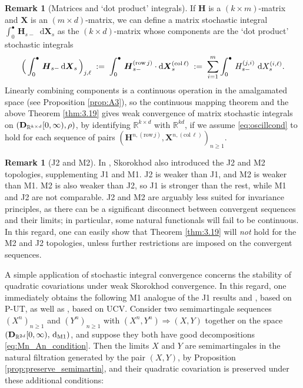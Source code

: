\documentclass[11pt]{article}
\theoremstyle{definition}\newtheorem{example}[theorem]{Example}
\theoremstyle{definition}\newtheorem{counterexample}[theorem]{Counterexample}
\theoremstyle{definition}\newtheorem{remark}[theorem]{Remark}
\theoremstyle{definition}\newtheorem{defi}[theorem]{Definition}
\numberwithin{equation}{section}
\newcommand{\R}{\mathbb{R}}
\newcommand{\D}{{\bf D}}											%
\newcommand*\diff{\mathop{}\!\mathrm{d}}								%
\renewcommand{\|}{\; : \, \;}											%
\newcommand{\dM}{\diff_{\operatorname{M1}}}							%
\begin{document}
\begin{remark}[Matrices and `dot product' integrals]
	If $\boldsymbol{H}$ is a $(k \times m)$-matrix and $\boldsymbol{X}$ is an $(m \times d)$-matrix, we can define a matrix stochastic integral $\int_0^\bullet \, \!\boldsymbol{H}_{s-} \diff \boldsymbol{X}_s$ as the $(k \times d)$-matrix whose components are the `dot product' stochastic integrals \[
	\Bigl( \, \int_0^\bullet \, \boldsymbol{H}_{s-} \diff \boldsymbol{X}_s\, \Bigr)_{j,\ell} \; := \; \int_0^\bullet \,\boldsymbol{H}^{(\text{row}\,j)}_{s-} \cdot \diff \boldsymbol{X}^{(\text{col}\,\ell)}_s \; :=  \; \sum_{i=1}^m 	\int_0^\bullet \, H^{(j,i)}_{s-}\, \diff X^{(i,\ell)}_s.
	\]
	Linearly combining components is a continuous operation in the  amalgamated space (see Proposition \ref{prop:A3}), so the continuous mapping theorem and the above Theorem \ref{thm:3.19} gives weak convergence of matrix stochastic integrals on $(\D_{\R^{k\times d}}[0,\infty), \rho)$, by identifying $\R^{k \times d}$ with $\R^{kd}$, if we assume \eqref{eq:oscillcond} to hold for each sequence of pairs $(\boldsymbol{H}^{n,(\text{row}\,j)},\boldsymbol{X}^{n,(\text{col}\,\ell)})_{n\ge 1}$.
\end{remark}



\begin{remark}[J2 and M2] In \cite{skorokhod}, Skorokhod also introduced the J2 and M2 topologies, supplementing J1 and M1. J2 is weaker than J1, and M2 is weaker than M1. M2 is also weaker than J2, so J1 is stronger than the rest, while M1 and J2 are not comparable. J2 and M2 are arguably less suited for invariance principles, as there can be a significant disconnect between convergent sequences and their limits; in particular, some natural functionals will fail to be continuous. In this regard, one can easily show that Theorem \ref{thm:3.19} will \emph{not} hold for the M2 and J2 topologies, unless further restrictions are imposed on the convergent sequences.
\end{remark}

A simple application of stochastic integral convergence concerns the stability of quadratic covariations under weak Skorokhod convergence. In this regard, one immediately obtains the following M1 analogue of the J1 results \cite[Cor.~2.8]{jakubowskimeminpages} and \cite[Thm.~VI.6.26]{shiryaev}, based on P-UT, as well as \cite[Thm.~7.12]{graham}, based on UCV. Consider two semimartingale sequences $(X^n)_{n\geq 1}$ and $(Y^n)_{n\geq 1}$ with $(X^n,Y^n) \Rightarrow (X,Y)$ together on the space $(\D_{\R^{2d}}[0,\infty), \, \dM)$, and suppose they both have good decompositions \eqref{eq:Mn_An_condition}. Then the limits $X$ and $Y$ are semimartingales in the natural filtration generated by the pair $(X,Y)$, by Proposition \ref{prop:preserve_semimartin}, and their quadratic covariation is preserved under these additional conditions:
\end{document}

